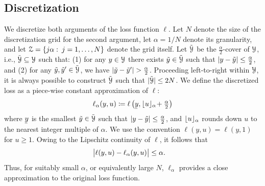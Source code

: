 \documentclass{article}
\begin{document}
\subsection{Discretization}

We discretize both arguments of the loss function $\ell$. Let $N$ denote the size of the discretization grid for the second argument, let $\alpha=1/N$ denote its granularity, and let  $\mathcal{Z}=\{j\alpha:\:j=1,\dotsc,N\}$ denote the grid itself. Let $\tilde{\mathcal{Y}}$ be the $\frac{\alpha}{2}$-cover of $\mathcal{Y}$, i.e., $\tilde{\mathcal{Y}}\subseteq\mathcal{Y}$ such that: (1) for any $y\in\mathcal{Y}$ there exists $\tilde{y}\in\tilde{\mathcal{Y}}$ such that $\left\lvert y-\tilde{y}\right\rvert\le\frac{\alpha}{2}$, and (2) for any $\tilde{y},\tilde{y}'\in\tilde{\mathcal{Y}}$, we have $\left\lvert\tilde{y}-\tilde{y}'\right\rvert>\frac{\alpha}{2}$. Proceeding left-to-right within $\mathcal{Y}$, it is always possible to construct $\tilde{\mathcal{Y}}$ such that $\lvert\tilde{\mathcal{Y}}\rvert\le 2N$. We define the discretized loss as a piece-wise constant approximation of $\ell$:
%
\begin{equation}
\label{eq:discretized}
  \ell_{\alpha}(y,u)
\coloneqq
  \ell\Parens{\undery,\floors{u}_\alpha\!+\tfrac{\alpha}{2}}
\end{equation}
where $\undery$ is the smallest $\tilde{y}\in\tilde{\mathcal{Y}}$ such that $\left\lvert y-\tilde{y}\right\rvert\le\frac{\alpha}{2}$,
and $\lfloor u\rfloor_\alpha$ rounds down $u$ to the nearest integer multiple of $\alpha$. We use the convention $\ell(y,u)=\ell(y,1)$ for $u\ge 1$. Owing to the Lipschitz continuity of $\ell$, it follows that
%
\begin{align}
&\bigl\lvert\ell(y,u) - \ell_\alpha(y,u)\bigr\rvert \leq \alpha.
\label{eq:disc-loss}
\end{align}
%
Thus, for suitably small $\alpha$, or equivalently large $N$, $\ell_\alpha$ provides a close approximation to the original loss function. %
\end{document}
